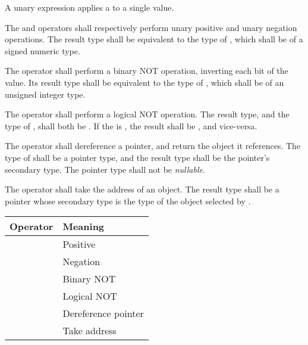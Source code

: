 
\begin{grammar}
 \\
	 \\
	  \\
	\terminal{\&}  \\

 \oneof \\
	\terminal{+}
	\terminal{-}
	\terminal{\textasciitilde}
	\terminal{!}
	\terminal{*}
\end{grammar}

\specsubsubitem
A unary expression applies a  to a single value.

\specsubsubitem
The \terminal{+} and \terminal{-} operators shall respectively perform unary
positive and unary negation operations. The result type shall be equivalent to
the type of , which shall be of a signed numeric
type.

\specsubsubitem
The \terminal{\textasciitilde} operator shall perform a binary NOT operation,
inverting each bit of the value. Its result type shall be equivalent to the
type of , which shall be of an unsigned integer
type.

\specsubsubitem
The \terminal{!} operator shall perform a logical NOT operation. The result
type, and the type of , shall both be
. If the  is , the
result shall be , and vice-versa.

\specsubsubitem
The \terminal{*} operator shall dereference a pointer, and return the object it
references.  The type of  shall be a pointer
type, and the result type shall be the pointer's secondary type. The pointer
type shall not be \textit{nullable}.

\specsubsubitem
The \terminal{\&} operator shall take the address of an object. The result type
shall be a pointer whose secondary type is the type of the object selected by
.


\begin{tabular}{r | l }
Operator & Meaning \\
\hline
\terminal{+} & Positive \\
\terminal{-} & Negation \\
\terminal{\textasciitilde} & Binary NOT \\
\terminal{!} & Logical NOT \\
\terminal{*} & Dereference pointer \\
\terminal{\&} & Take address \\
\end{tabular}

